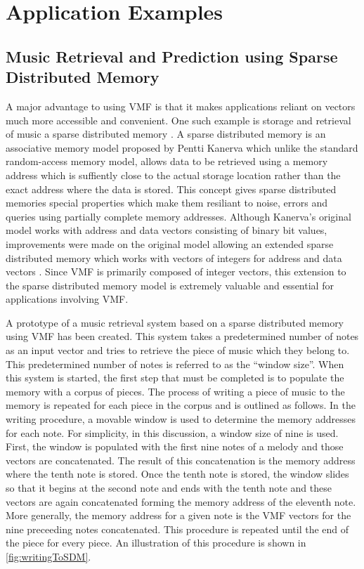 
\section{Application Examples}

\subsection{Music Retrieval and Prediction using Sparse Distributed Memory}

A major advantage to using VMF is that it makes applications reliant on vectors much more accessible and convenient. One such example is storage and retrieval of music a sparse distributed memory \citep*{Kane88, Roge89}. A sparse distributed memory is an associative memory model proposed by Pentti Kanerva which unlike the standard random-access memory model, allows data to be retrieved using a memory address which is suffiently close to the actual storage location rather than the exact address where the data is stored. This concept gives sparse distributed memories special properties which make them resiliant to noise, errors and queries using partially complete memory addresses. Although Kanerva's original model works with address and data vectors consisting of binary bit values, improvements were made on the original model allowing an extended sparse distributed memory which works with vectors of integers for address and data vectors \citep*{Snai13}. Since VMF is primarily composed of integer vectors, this extension to the sparse distributed memory model is extremely valuable and essential for applications involving VMF.

A prototype of a music retrieval system based on a sparse distributed memory using VMF has been created. This system takes a predetermined number of notes as an input vector and tries to retrieve the piece of music which they belong to. This predetermined number of notes is referred to as the ``window size''. When this system is started, the first step that must be completed is to populate the memory with a corpus of pieces. The process of writing a piece of music to the memory is repeated for each piece in the corpus and is outlined as follows. In the writing procedure, a movable window is used to determine the memory addresses for each note. For simplicity, in this discussion, a window size of nine is used. First, the window is populated with the first nine notes of a melody and those vectors are concatenated. The result of this concatenation is the memory address where the tenth note is stored. Once the tenth note is stored, the window slides so that it begins at the second note and ends with the tenth note and these vectors are again concatenated forming the memory address of the eleventh note. More generally, the memory address for a given note is the VMF vectors for the nine preceeding notes concatenated. This procedure is repeated until the end of the piece for every piece. An illustration of this procedure is shown in \ref{fig:writingToSDM}.

